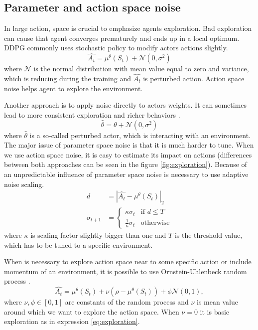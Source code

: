 \subsection{Parameter and action space noise}
\label{sec:exploration}
In large action, space is crucial to emphasize agents exploration. Bad exploration can cause that agent converges prematurely and ends up in a local optimum. DDPG commonly uses stochastic policy to modify actors actions slightly.
\begin{equation} \label{eq:exploration}
\hat{A_t} = \mu^\theta(S_t) + \mathcal{N}(0, \sigma^2)
\end{equation}
where $\mathcal{N}$ is the normal distribution with mean value equal to zero and variance, which is reducing during the training and $\hat{A_t}$ is perturbed action. Action space noise helps agent to explore the environment. \par Another approach is to apply noise directly to actors weights. It can sometimes lead to more consistent exploration and richer behaviors \cite{plappert2017}.
\begin{equation}
\hat{\theta} = \theta + \mathcal{N}(0, \sigma^2)
\end{equation}
where $\hat{\theta}$ is a so-called perturbed actor, which is interacting with an environment. The major issue of parameter space noise is that it is much harder to tune. When we use action space noise, it is easy to estimate its impact on actions (differences between both approaches can be seen in the figure \ref{fig:exploration}). Because of an unpredictable influence of parameter space noise is necessary to use adaptive noise scaling.
\begin{align}
d &= |\hat{A_t} - \mu^\theta(S_t)|_2  \\
\sigma_{t+1} &= 
     \begin{cases}
       \kappa \sigma_t & \text{if } d \leq T \\
       \frac{1}{\kappa}\sigma_t & \text{otherwise}
     \end{cases}
\end{align}
where $\kappa$ is scaling factor slightly bigger than one and $T$ is the threshold value, which has to be tuned to a specific environment.
\par When is necessary to explore action space near to some specific action or include momentum of an environment, it is possible to use Ornstein-Uhlenbeck random process \citep{lilicrap2015}. 
\begin{equation}
\hat{A_t} = \mu^\theta(S_t)  + \nu (\rho - \mu^\theta(S_t)) + \phi \mathcal{N}(0, 1),
\end{equation}
where $\nu, \phi \in [0, 1]$ are constants of the random process and $\nu$ is mean value around which we want to explore the action space. When $\nu = 0$ it is basic exploration as in expression \eqref{eq:exploration}.

